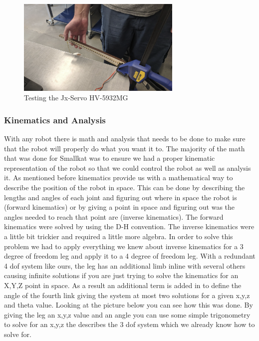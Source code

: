                \begin{figure}[H]
                    \centering
                    \includegraphics[width=0.7\textwidth]{figures/TestingMotors.png}
                    \caption{Testing the Jx-Servo HV-5932MG}
                    \label{fig:MotorTesting}
                \end{figure}        

        \subsubsection{Kinematics and Analysis}
        
            With any robot there is math and analysis that needs to be done to make sure that the robot will properly do what you want it to. The majority of the math that was done for Smallkat was to ensure we had a proper kinematic representation of the robot so that we could control the robot as well as analysis it. As mentioned before kinematics provide us with a mathematical way to describe the position of the robot in space. This can be done by describing the lengths and angles of each joint and figuring out where in space the robot is (forward kinematics) or by giving a point in space and figuring out was the angles needed to reach that point are (inverse kinematics). The forward kinematics were solved by using the D-H convention. The inverse kinematics were a little bit trickier and required a little more algebra. In order to solve this problem we had to apply everything we knew about inverse kinematics for a 3 degree of freedom leg and apply it to a 4 degree of freedom leg. With a redundant 4 dof system like ours, the leg has an additional limb inline with several others causing infinite solutions if you are just trying to solve the kinematics for an X,Y,Z point in space. As a result an additional term is added in to define the angle of the fourth link giving the system at most two solutions for a given x,y,z and theta value. Looking at the picture below you can see how this was done. By giving the leg an x,y,z value and an angle you can use some simple trigonometry to solve for an x,y,z the describes the 3 dof system which we already know how to solve for. 
        
